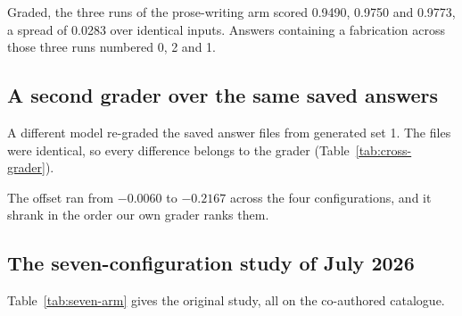 \begin{table}[htbp]
\caption{Answer text compared character by character against the first run, over
the same 30 questions. Produced by .}
\label{tab:repeats}
\centering\small

\end{table}

Graded, the three runs of the prose-writing arm scored 0.9490, 0.9750 and
0.9773, a spread of 0.0283 over identical inputs. Answers containing a
fabrication across those three runs numbered 0, 2 and 1.

\subsection{A second grader over the same saved answers}

A different model re-graded the saved answer files from generated set 1. The
files were identical, so every difference belongs to the grader
(Table~\ref{tab:cross-grader}).

\begin{table}[htbp]
\caption{Two graders over one set of saved answers. \emph{Offset} is our
grader's mean minus the second grader's mean. $r$ is the Pearson correlation
between the two graders' per-question scores. The second grader emitted only two
distinct scores, 0.5 and 1.0, which floors $r$ on the three high-scoring rows.
Produced by .}
\label{tab:cross-grader}
\centering\small

\end{table}

The offset ran from $-0.0060$ to $-0.2167$ across the four configurations, and
it shrank in the order our own grader ranks them.

\subsection{The seven-configuration study of July 2026}

Table~\ref{tab:seven-arm} gives the original study, all on the co-authored
catalogue.

\begin{table}[htbp]
\caption{The July 2026 study, 120 co-authored questions per arm, graded by an
independent Sonnet~5 panel. Arm G is the pre-2026-08 no-templates control.
Wall clock is one machine, one run, no parallelism across sub-questions.
Produced by .}
\label{tab:seven-arm}
\centering\small

\end{table}

